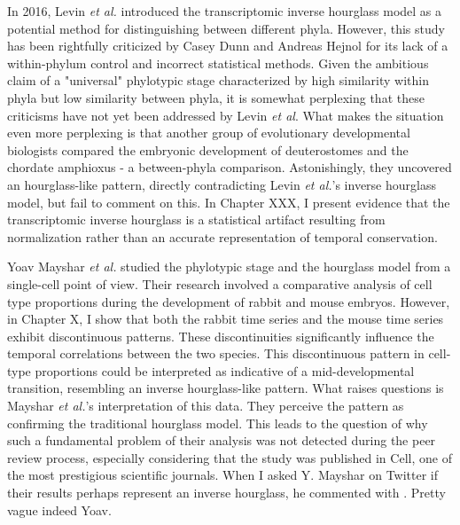 In 2016, Levin \textit{et al.} introduced the transcriptomic inverse hourglass model as a potential method for distinguishing between different phyla\cite{Levin2016}. However, this study has been rightfully criticized by Casey Dunn and Andreas Hejnol for its lack of a within-phylum control\cite{hejnol2016} and incorrect statistical methods\cite{Dunn2018}. Given the ambitious claim of a "universal" phylotypic stage characterized by high similarity within phyla but low similarity between phyla, it is somewhat perplexing that these criticisms have not yet been addressed by Levin \textit{et al}. What makes the situation even more perplexing is that another group of evolutionary developmental biologists compared the embryonic development of deuterostomes and the chordate amphioxus - a between-phyla comparison. Astonishingly, they uncovered an hourglass-like pattern\cite{PerezPosada2022}, directly contradicting Levin \textit{et al.}'s inverse hourglass model, but fail to comment on this. In Chapter XXX, I present evidence that the transcriptomic inverse hourglass is a statistical artifact resulting from normalization rather than an accurate representation of temporal conservation. 

Yoav Mayshar \textit{et al.} studied the phylotypic stage and the hourglass model from a single-cell point of view\cite{Mayshar2023}. Their research involved a comparative analysis of cell type proportions during the development of rabbit and mouse embryos. However, in Chapter X, I show that both the rabbit time series and the mouse time series exhibit discontinuous patterns. These discontinuities significantly influence the temporal correlations between the two species. This discontinuous pattern in cell-type proportions could be interpreted as indicative of a mid-developmental transition, resembling an inverse hourglass-like pattern. What raises questions is Mayshar \textit{et al.}'s interpretation of this data. They perceive the pattern as confirming the traditional hourglass model. This leads to the question of why such a fundamental problem of their analysis was not detected during the peer review process, especially considering that the study was published in Cell, one of the most prestigious scientific journals. When I asked Y. Mayshar on Twitter if their results perhaps represent an inverse hourglass, he commented with . Pretty vague indeed Yoav.

